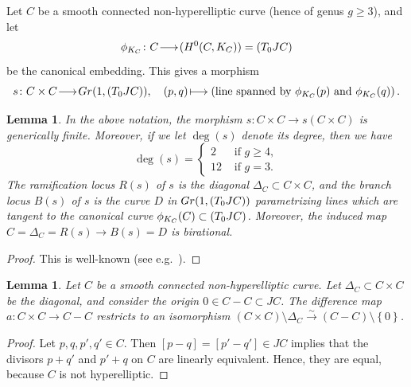 \documentclass[a4paper,11pt,reqno]{amsart}
\makeatletter
\numberwithin{equation}{section}
\theoremstyle{plain}
\newtheorem{lemma}[theorem]{Lemma}
\theoremstyle{definition}
\let\P\relax
\newcommand{\P}{\mathbb P}
\let\rm\relax
\newcommand{\rm}[1]{{\mathrm{#1}}}
\renewcommand{\longrightarrow}{\xymatrix@1@=15pt{\ar[r]&}}
\renewcommand{\mapsto}{\xymatrix@1@=15pt{\ar@{|->}[r]&}}
\newcommand{\set}[1]{\left\{ #1 \right\}}
\makeatother
\begin{document}
Let $C$ be a smooth connected non-hyperelliptic curve (hence of genus $g\geq 3$), and let 
\[
\phi_{K_C} \colon C \longrightarrow \P (H^0(C, K_C) )  = \P\left( T_0JC\right) 
\]
be the canonical embedding. This gives a morphism
\[
s \colon C \times C \longrightarrow  \rm{Gr}(1, \P(T_0JC)), \quad (p,q) \mapsto \left(\text{line spanned by $\phi_{K_C}(p)$ and $\phi_{K_C}(q)$}\right).
\]
\begin{lemma}  \label{lemma:delta-birational}
In the above notation, the morphism $s \colon C \times C \to s(C \times C)$ is generically finite. 
Moreover, if we let $\deg(s) $ denote its degree, then we have 
\[
\deg(s) = 
\begin{cases}
2 & \text{ if } g \geq 4, \\
12 & \text{ if } g = 3. 
\end{cases}
\]
The ramification locus $R(s)$ of $s$ is the diagonal $\Delta_C \subset C \times C$, and the branch locus $B(s)$ of $s$ is the curve $D$ in $\rm{Gr}(1, \P(T_0JC))$ parametrizing lines which are tangent to the canonical curve $\phi_{K_C}(C) \subset \P\left( T_0JC\right)$. Moreover, the induced map $C = \Delta_C = R(s) \to B(s) = D$ is birational. 
\end{lemma}
\begin{proof}
This is well-known (see e.g.\ \cite[Remark 3.1.2]{bardellipirola-curvesofgenusg}). 
\end{proof}

\begin{lemma} \label{lem:diagonal-contraction}
    Let $C$ be a smooth connected non-hyperelliptic curve. Let $\Delta_C \subset C \times C$ be the diagonal, and consider the origin $0 \in C-C \subset JC$. The difference map $a \colon C \times C \to C-C$ restricts to an isomorphism $\left(C\times C\right)\setminus \Delta_C\xrightarrow{\sim} \left(C-C \right) \setminus \set{0}$. 
\end{lemma}
\begin{proof}
Let $p,q, p', q' \in C$. Then $[p - q] = [p' - q'] \in JC$ implies that the divisors $p+q'$ and $p'+q$ on $C$ are linearly equivalent. Hence, they are equal, because $C$ is not hyperelliptic. 
\end{proof}
\end{document}
